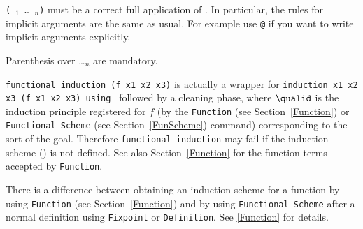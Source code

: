 \Rem \texttt{(\qualid\ \term$_1$ \dots\ \term$_n$)} must be a correct
full application of \qualid. In particular, the rules for implicit
arguments are the same as usual. For example use \texttt{@\qualid} if
you want to write implicit arguments explicitly.

\Rem Parenthesis over \qualid \dots \term$_n$ are mandatory.

\Rem \texttt{functional induction (f x1 x2 x3)} is actually a wrapper
for \texttt{induction x1 x2 x3 (f x1 x2 x3) using \qualid} followed by
a cleaning phase, where $\qualid$ is the induction principle
registered for $f$ (by the \texttt{Function} (see Section~\ref{Function})
or \texttt{Functional Scheme} (see Section~\ref{FunScheme}) command)
corresponding to the sort of the goal.  Therefore \texttt{functional
  induction} may fail if the induction scheme (\texttt{\qualid}) is
not defined. See also Section~\ref{Function} for the function terms
accepted by \texttt{Function}.

\Rem There is a difference between obtaining an induction scheme for a
function by using \texttt{Function} (see Section~\ref{Function}) and by
using \texttt{Functional Scheme} after a normal definition using
\texttt{Fixpoint} or \texttt{Definition}. See \ref{Function} for
details.

\SeeAlso{\ref{Function},\ref{FunScheme},\ref{FunScheme-examples},
  \ref{sec:functional-inversion}}

\begin{ErrMsgs}
\item {}

  ~

\item {}
\end{ErrMsgs}




